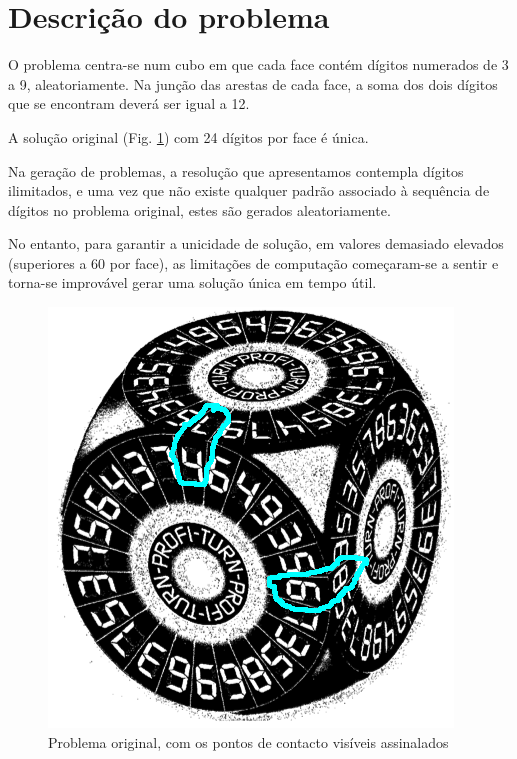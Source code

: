 
\section{Descrição do problema}
\label{sec:3}
O problema centra-se num cubo em que cada face contém dígitos numerados de 3 a 9, aleatoriamente. Na junção das arestas de cada face, a soma dos dois dígitos que se encontram deverá ser igual a 12.

A solução original (Fig. \ref{fig:1}) com 24 dígitos por face é única.

Na geração de problemas, a resolução que apresentamos contempla dígitos ilimitados, e uma vez que não existe qualquer padrão associado à sequência de dígitos no problema original, estes são gerados aleatoriamente.

No entanto, para garantir a unicidade de solução, em valores demasiado elevados (superiores a 60 por face), as limitações de computação começaram-se a sentir e torna-se improvável gerar uma solução única em tempo útil.

\begin{figure}[H]
\begin{center}
\includegraphics[scale=0.4]{turn12.png}
\caption{Problema original, com os pontos de contacto visíveis assinalados}
\label{fig:1}
\end{center}
\end{figure}



